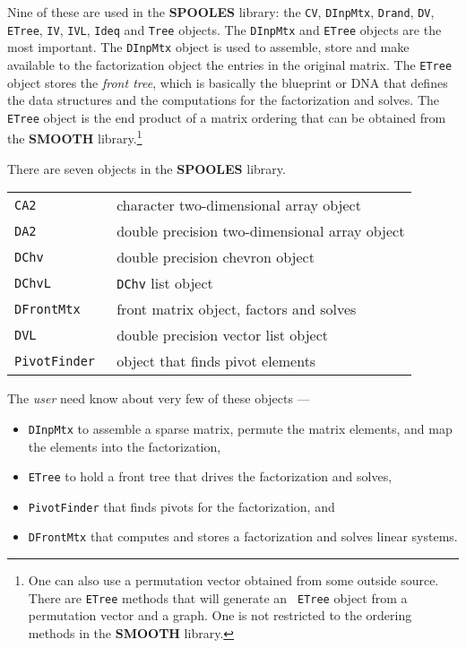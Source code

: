 Nine of these are used in the {\bf SPOOLES} library:
the
{\tt CV},
{\tt DInpMtx},
{\tt Drand},
{\tt DV},
{\tt ETree},
{\tt IV},
{\tt IVL},
{\tt Ideq} and
{\tt Tree} objects.
The {\tt DInpMtx} and {\tt ETree} objects are the most important.
The {\tt DInpMtx} object is used to assemble, store and make
available to the factorization object the entries in the original
matrix.
The {\tt ETree} object stores the {\it front tree}, which is
basically the blueprint or DNA that defines the data structures 
and the computations for the factorization and solves.
The {\tt ETree} object is the end product of a matrix ordering
that can be obtained from the {\bf SMOOTH} library.\footnote{
One can also use a permutation vector obtained from some outside
source. There are {\tt ETree} methods that will generate an {\tt
ETree} object from a permutation vector and a graph.
One is not restricted to the ordering methods in the {\bf SMOOTH}
library.
}
\par
There are seven objects in the {\bf SPOOLES} library.
\begin{center}
\begin{tabular}{|l|l|} \hline
{\tt CA2 } & character two-dimensional array object \\
{\tt DA2 } & double precision two-dimensional array object \\
{\tt DChv } & double precision chevron object \\
{\tt DChvL } & {\tt DChv} list object \\
{\tt DFrontMtx } & front matrix object, factors and solves \\
{\tt DVL } & double precision vector list object \\
{\tt PivotFinder } & object that finds pivot elements \\ 
\hline
\end{tabular}
\end{center}
\par
The {\it user} need know about very few of these objects --- 
\begin{itemize}
\item
{\tt DInpMtx} to assemble a sparse matrix, permute the matrix
elements, and map the elements into the factorization,
\item
{\tt ETree} to hold a front tree 
that drives the factorization and solves,
\item
{\tt PivotFinder} that finds pivots for the factorization, and
\item
{\tt DFrontMtx} that computes and stores a factorization and
solves linear systems.
\end{itemize}
